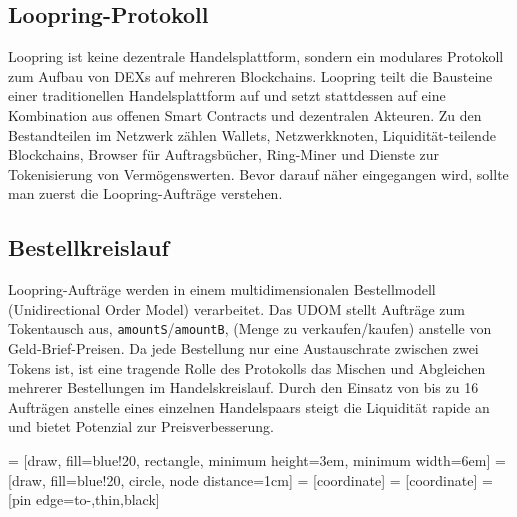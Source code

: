 \documentclass[UTF8,nofonts]{article}
\makeatletter
\newenvironment{figurehere}
 {\def\@captype{figure}}
 {}
\makeatother
\begin{document}
\begin{multicols}{2}
\section{Loopring-Protokoll\label{sec:loopring_protocol}}
Loopring ist keine dezentrale Handelsplattform, sondern ein modulares Protokoll zum Aufbau von DEXs auf mehreren Blockchains. Loopring teilt die Bausteine einer traditionellen Handelsplattform auf und setzt stattdessen auf eine Kombination aus offenen Smart Contracts und dezentralen Akteuren. Zu den Bestandteilen im Netzwerk zählen Wallets, Netzwerkknoten, Liquidität-teilende Blockchains, Browser für Auftragsbücher, Ring-Miner und Dienste zur Tokenisierung von Vermögenswerten. Bevor darauf näher eingegangen wird, sollte man zuerst die Loopring-Aufträge verstehen.

\subsection{Bestellkreislauf\label{sec:order_ring}}
Loopring-Aufträge werden in einem multidimensionalen Bestellmodell (Unidirectional Order Model) \cite{coinport2014udom} verarbeitet. Das UDOM stellt Aufträge zum Tokentausch aus, \verb|amountS|/\verb|amountB|, (Menge zu verkaufen/kaufen) anstelle von Geld-Brief-Preisen. Da jede Bestellung nur eine Austauschrate zwischen zwei Tokens ist, ist eine tragende Rolle des Protokolls das Mischen und Abgleichen mehrerer Bestellungen im Handelskreislauf. Durch den Einsatz von bis zu 16 Aufträgen anstelle eines einzelnen Handelspaars steigt die Liquidität rapide an und bietet Potenzial zur Preisverbesserung.

\begin{center}
\begin{figurehere}
\centering
{} = [draw, fill=blue!20, rectangle, 
    minimum height=3em, minimum width=6em]
 = [draw, fill=blue!20, circle, node distance=1cm]
 = [coordinate]
 = [coordinate]
 = [pin edge={to-,thin,black}]

\end{figurehere}
\end{center}
\end{multicols}
\end{document}
